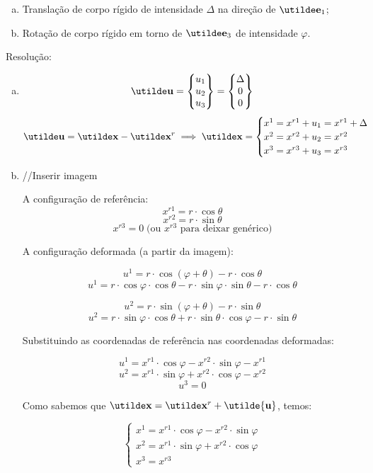 \begin{enumerate}[a)]
	\item Translação de corpo rígido de intensidade $\Delta$ na direção de $\vt{e}_1$;
	\item Rotação de corpo rígido em torno de $\vt{e}_3$ de intensidade $\varphi$.
\end{enumerate}
	
Resolução:
	
\begin{enumerate}[a)]
	\item
		\[
		\vt{u}=
			\begin{Bmatrix}
			u_1 \\ u_2 \\ u_3
			\end{Bmatrix}
			=
			\begin{Bmatrix}
				\Delta \\ 0 \\ 0
			\end{Bmatrix}
		\]
		\[\vt{u}=\vt{x}-\vt{x}^r
		\implies
		\vt{x}=
		\begin{cases} x^1=x^{r1}+u_1=x^{r1}+\Delta \\ x^2=x^{r2}+u_2=x^{r2} \\ x^3=x^{r3}+u_3=x^{r3}
		\end{cases}
		\]
	\item
		//Inserir imagem
			
		A configuração de referência:
		\[x^{r1}=r\cdot \cos\theta\]
		\[x^{r2}=r\cdot\sin\theta\]
		\[x^{r3}=0\;\text{(ou }x^{r3}\text{ para deixar genérico})\]
			
		A configuração deformada (a partir da imagem):
			
		\[u^1=r\cdot\cos(\varphi+\theta)-r\cdot\cos\theta\]
		\[u^1=r\cdot\cos\varphi\cdot\cos\theta-r\cdot\sin\varphi\cdot\sin\theta-r\cdot\cos\theta\]
			
		\[u^2=r\cdot\sin(\varphi+\theta)-r\cdot\sin\theta\]
		\[u^2=r\cdot\sin\varphi\cdot\cos\theta+r\cdot\sin\theta\cdot\cos\varphi-r\cdot\sin\theta\]
			
		Substituindo as coordenadas de referência nas coordenadas deformadas:

		\[u^1=x^{r1}\cdot\cos\varphi-x^{r2}\cdot\sin\varphi-x^{r1}\]
		\[u^2=x^{r1}\cdot\sin\varphi+x^{r2}\cdot\cos\varphi-x^{r2}\]
		\[u^3=0\]
			
		Como sabemos que $\vt{x}=\vt{x}^r+\utilde{\mathbf{u}}$, temos:
			
		\[
			\begin{cases}
				x^1=x^{r1}\cdot\cos\varphi-x^{r2}\cdot\sin\varphi \\ x^2=x^{r1}\cdot\sin\varphi+x^{r2}\cdot\cos\varphi \\ x^3=x^{r3}
			\end{cases}
		\]
			

\end{enumerate}
